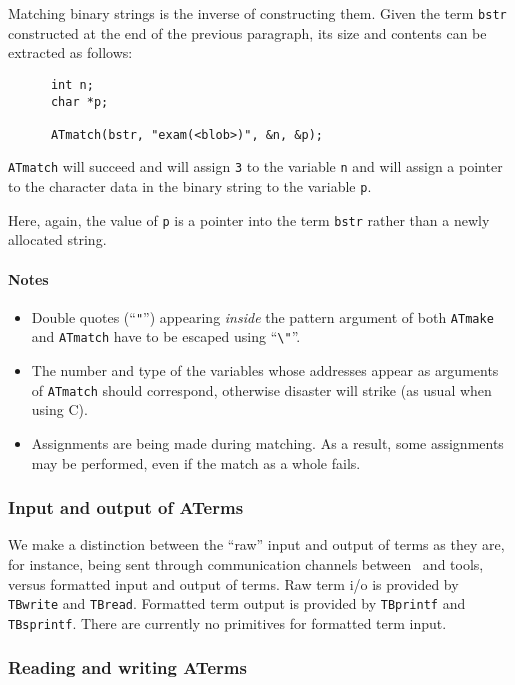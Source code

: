\documentclass[a4,twoside,noweb]{article} %
\begin{document}
Matching binary strings is the inverse of constructing them. Given
the term {\tt bstr} constructed at the end of the previous paragraph,
its size and contents can be extracted as follows:
\begin{verbatim}
      int n;
      char *p;

      ATmatch(bstr, "exam(<blob>)", &n, &p);
\end{verbatim}
{\tt ATmatch} will succeed and will assign {\tt 3} to the variable
{\tt n} and will assign a pointer to the character data in the binary
string to the variable {\tt p}.

Here, again, the value of {\tt p} is a pointer into the term {\tt bstr}
rather than a newly allocated string.

\paragraph{Notes}
\begin{itemize}
\item Double quotes (``{\tt "}'') appearing {\em inside} the pattern argument
of both {\tt ATmake} and {\tt ATmatch} have to be escaped using ``\verb-\"-''.
\item The number and type of the variables whose addresses appear
as arguments of {\tt ATmatch} should correspond, otherwise disaster
will strike (as usual when using C).
\item Assignments are being made during matching. As a result, some assignments
may be performed, even if the match as a whole fails.

\end{itemize}

\subsubsection{\label{ATermIO}Input and output of ATerms}
We make a distinction between the ``raw'' input and output of terms
as they are, for instance, being sent through communication
channels between \TB\ and tools, versus formatted input and output
of terms. Raw term i/o is provided by {\tt TBwrite} and {\tt TBread}.
Formatted term output is provided by {\tt TBprintf} and {\tt TBsprintf}.
There are currently no primitives for formatted term input.

\subsubsection{\label{ATread/write}Reading and writing ATerms}
\end{document}
